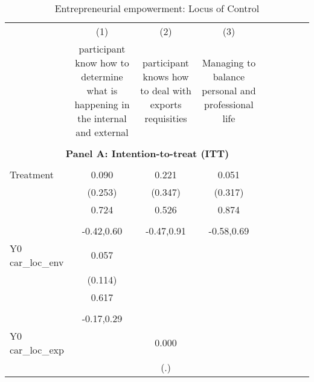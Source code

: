 \begin{table}[!h] \centering \\ \caption{Entrepreneurial empowerment: Locus of Control} \\ \begin{adjustbox}{width=\columnwidth,center} \\ \begin{tabular}{l*{8}{c}} \hline\hline
                    &\multicolumn{1}{c}{(1)}         &\multicolumn{1}{c}{(2)}         &\multicolumn{1}{c}{(3)}         \\
                    &participant know how to determine what is happening in the internal and external         &participant knows how to deal with exports requisities         &Managing to balance personal and professional life         \\
\hline \\ \multicolumn{7}{c}{\textbf{Panel A: Intention-to-treat (ITT)}} \\\\[-1ex]
Treatment           &       0.090         &       0.221         &       0.051         \\
                    &     (0.253)         &     (0.347)         &     (0.317)         \\
                    &       0.724         &       0.526         &       0.874         \\
                    &                     &                     &                     \\
                    &  -0.42,0.60         &  -0.47,0.91         &  -0.58,0.69         \\
Y0 car\_loc\_env      &       0.057         &                     &                     \\
                    &     (0.114)         &                     &                     \\
                    &       0.617         &                     &                     \\
                    &                     &                     &                     \\
                    &  -0.17,0.29         &                     &                     \\
Y0 car\_loc\_exp      &                     &       0.000         &                     \\
                    &                     &         (.)         &                     \\

\end{tabular}
\end{adjustbox}
\end{table}
